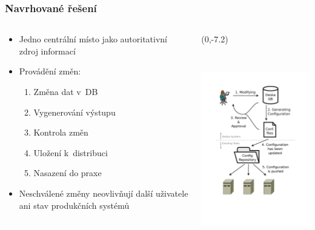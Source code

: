 \documentclass{beamer}
\begin{document}
\begin{frame}[fragile]
\frametitle{Navrhované řešení}
\begin{columns}
\begin{column}{.45\paperwidth}
    \begin{itemize}
        \item Jedno centrální místo jako autoritativní zdroj informací
        \item Provádění změn:
            \begin{enumerate}
                \item Změna dat v~DB
                \item Vygenerování výstupu
                \item Kontrola změn
                \item Uložení k~distribuci
                \item Nasazení do praxe
            \end{enumerate}
        \item Neschválené změny neovlivňují další uživatele ani stav produkčních systémů
    \end{itemize}
\end{column}
\begin{column}{.55\paperwidth}
\begin{textblock}{50}(0,-7.2)
\includegraphics[height=90mm, trim=28mm 53mm 30mm 28mm, clip=true]{../../technical/img-deska-workflow.pdf}
\end{textblock}
\end{column}
\end{columns}
\end{frame}
\end{document}
